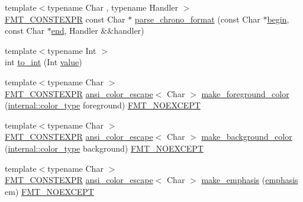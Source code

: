 \begin{DoxyCompactItemize}
\item 
{\footnotesize template$<$typename Char , typename Handler $>$ }\\\hyperlink{core_8h_a69201cb276383873487bf68b4ef8b4cd}{F\+M\+T\+\_\+\+C\+O\+N\+S\+T\+E\+X\+PR} const Char $\ast$ \hyperlink{namespaceinternal_adb293fc437669ac43eac0ca61734db90}{parse\+\_\+chrono\+\_\+format} (const Char $\ast$\hyperlink{namespaceinternal_a265f36d9dee68d3f44381347ef2fd5cb}{begin}, const Char $\ast$\hyperlink{namespaceinternal_a94820de1710dc8038fa6f188adfe299b}{end}, Handler \&\&handler)
\item 
{\footnotesize template$<$typename Int $>$ }\\int \hyperlink{namespaceinternal_a5f8d44f2e5d158dd370308bbbf35ac1c}{to\+\_\+int} (Int \hyperlink{classinternal_1_1value}{value})
\item 
{\footnotesize template$<$typename Char $>$ }\\\hyperlink{core_8h_a69201cb276383873487bf68b4ef8b4cd}{F\+M\+T\+\_\+\+C\+O\+N\+S\+T\+E\+X\+PR} \hyperlink{structinternal_1_1ansi__color__escape}{ansi\+\_\+color\+\_\+escape}$<$ Char $>$ \hyperlink{namespaceinternal_a56894b652f5ab606bb044029aa8a779f}{make\+\_\+foreground\+\_\+color} (\hyperlink{structinternal_1_1color__type}{internal\+::color\+\_\+type} foreground) \hyperlink{core_8h_aef128913e8400683b1cbd1a3a2e11df3}{F\+M\+T\+\_\+\+N\+O\+E\+X\+C\+E\+PT}
\item 
{\footnotesize template$<$typename Char $>$ }\\\hyperlink{core_8h_a69201cb276383873487bf68b4ef8b4cd}{F\+M\+T\+\_\+\+C\+O\+N\+S\+T\+E\+X\+PR} \hyperlink{structinternal_1_1ansi__color__escape}{ansi\+\_\+color\+\_\+escape}$<$ Char $>$ \hyperlink{namespaceinternal_aca83fc7269ad3f336a18bbea14255a99}{make\+\_\+background\+\_\+color} (\hyperlink{structinternal_1_1color__type}{internal\+::color\+\_\+type} background) \hyperlink{core_8h_aef128913e8400683b1cbd1a3a2e11df3}{F\+M\+T\+\_\+\+N\+O\+E\+X\+C\+E\+PT}
\item 
{\footnotesize template$<$typename Char $>$ }\\\hyperlink{core_8h_a69201cb276383873487bf68b4ef8b4cd}{F\+M\+T\+\_\+\+C\+O\+N\+S\+T\+E\+X\+PR} \hyperlink{structinternal_1_1ansi__color__escape}{ansi\+\_\+color\+\_\+escape}$<$ Char $>$ \hyperlink{namespaceinternal_a09a404b74dbbf80f1705c723f775e12f}{make\+\_\+emphasis} (\hyperlink{color_8h_a535b59b8edc8902bb3c4f254625f91ba}{emphasis} em) \hyperlink{core_8h_aef128913e8400683b1cbd1a3a2e11df3}{F\+M\+T\+\_\+\+N\+O\+E\+X\+C\+E\+PT}

\end{DoxyCompactItemize}
